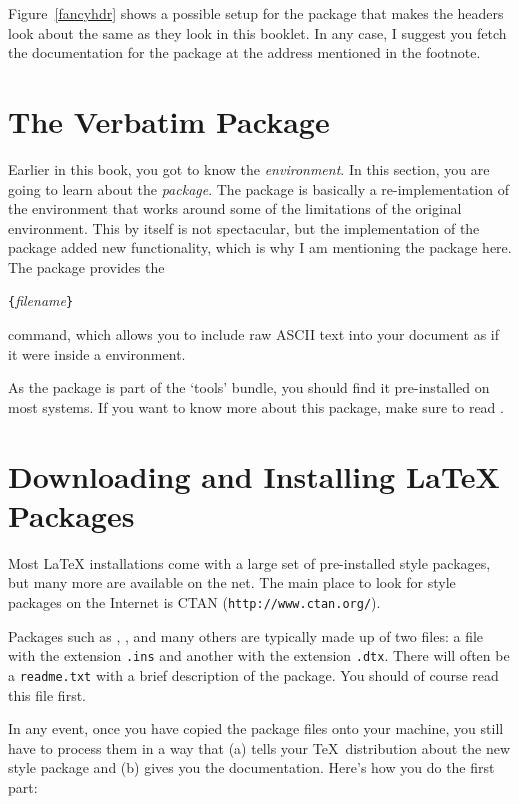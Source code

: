  
Figure~\ref{fancyhdr} shows a possible setup for the 
package that makes the headers look about the same as they look in
this booklet. In any case, I suggest you fetch the documentation for
the package at the address mentioned in the footnote. 

\section{The Verbatim Package}

Earlier in this book, you got to know the 
\emph{environment}.  In this section, you are going to learn about the
 \emph{package}. The  package is basically
a re-implementation of the  environment that works around
some of the limitations of the original  environment.
This by itself is not spectacular, but the implementation of the
 package added new functionality, which is
why I am mentioning the package here. The 
package provides the

\begin{lscommand}
\verb|{|\emph{filename}\verb|}|
\end{lscommand}

\noindent command, which allows you to include raw ASCII text into your
document as if it were inside a  environment.

As the  package is part of the `tools' bundle, you
should find it pre-installed on most systems. If you want to know more
about this package, make sure to read \cite{verbatim}.


\section{Downloading and Installing \LaTeX{} Packages}

Most \LaTeX{} installations come with a large set of pre-installed
style packages, but many more are available on the net. The main
place to look for style packages on the Internet is CTAN (\verb|http://www.ctan.org/|).

Packages such as , , and many
others are typically made up of two files: a file with the extension
\texttt{.ins} and another with the extension \texttt{.dtx}. There
will often be a \texttt{readme.txt} with a brief description of the
package. You should of course read this file first.

In any event, once you have copied the package files onto your
machine, you still have to process them in a way that (a) tells your
\TeX\ distribution about the new style package and (b) gives you
the documentation.  Here's how you do the first part:

